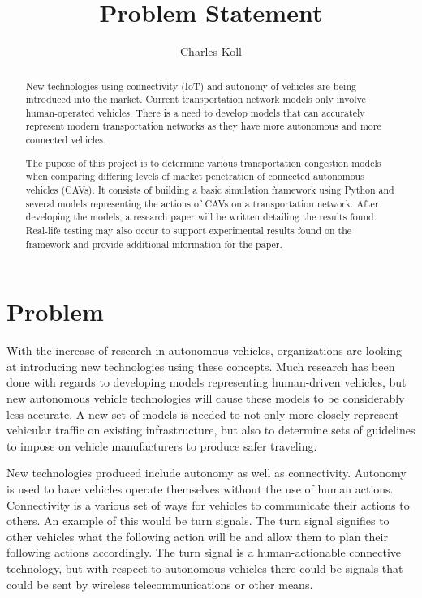 \documentclass[10pt,letterpaper,draftclsnofoot,onecolumn]{IEEEtran}
\begin{document}
\author{Charles Koll}
\title{Problem Statement}
\maketitle

\begin{abstract}
	New technologies using connectivity (IoT) and autonomy of vehicles are being introduced into the market. Current transportation network models only involve human-operated vehicles. There is a need to develop models that can accurately represent modern transportation networks as they have more autonomous and more connected vehicles.

	The pupose of this project is to determine various transportation congestion models when comparing differing levels of market penetration of connected autonomous vehicles (CAVs). It consists of building a basic simulation framework using Python and several models representing the actions of CAVs on a transportation network. After developing the models, a research paper will be written detailing the results found. Real-life testing may also occur to support experimental results found on the framework and provide additional information for the paper.
\end{abstract}

\pagebreak

\section{Problem}
	With the increase of research in autonomous vehicles, organizations are looking at introducing new technologies using these concepts. Much research has been done with regards to developing models representing human-driven vehicles, but new autonomous vehicle technologies will cause these models to be considerably less accurate. A new set of models is needed to not only more closely represent vehicular traffic on existing infrastructure, but also to determine sets of guidelines to impose on vehicle manufacturers to produce safer traveling.

	New technologies produced include autonomy as well as connectivity. Autonomy is used to have vehicles operate themselves without the use of human actions. Connectivity is a various set of ways for vehicles to communicate their actions to others. An example of this would be turn signals. The turn signal signifies to other vehicles what the following action will be and allow them to plan their following actions accordingly. The turn signal is a human-actionable connective technology, but with respect to autonomous vehicles there could be signals that could be sent by wireless telecommunications or other means.
\end{document}
